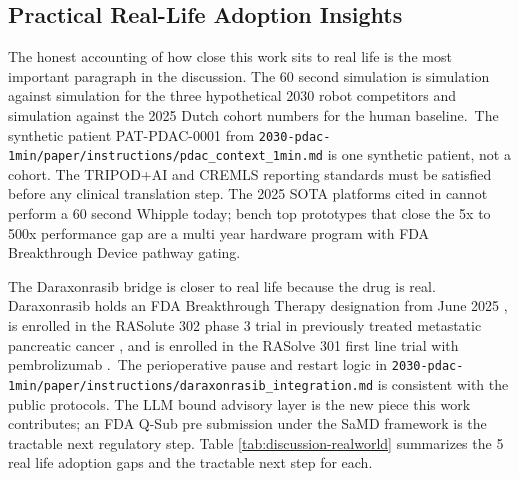\subsection{Practical Real-Life Adoption Insights}
\label{sec:discussion-realworld}

The honest accounting of how close this work sits to real life is
the most important paragraph in the discussion. The 60 second
simulation is simulation against simulation for the three
hypothetical 2030 robot competitors and simulation against the
2025 Dutch cohort numbers \cite{DutchCohort2025Whipple} for the
human baseline.\ The synthetic patient PAT-PDAC-0001 from
\texttt{2030-pdac-1min/paper/instructions/pdac_context_1min.md}
is one synthetic patient, not a cohort. The TRIPOD+AI
\cite{Collins2024TRIPODAI} and CREMLS \cite{ElEmam2024CREMLS}
reporting standards must be satisfied before any clinical
translation step. The 2025 SOTA platforms cited in
\cite{intuitive-davinci-sp, medtronic-hugo-ras}
cannot perform a 60 second Whipple today; bench top prototypes
that close the 5x to 500x performance gap are a multi year
hardware program with FDA Breakthrough Device pathway gating.

The Daraxonrasib bridge is closer to real life because the drug
is real. Daraxonrasib holds an FDA Breakthrough Therapy
designation from June 2025 \cite{rev-fda-breakthrough}, is
enrolled in the RASolute 302 phase 3 trial in previously treated
metastatic pancreatic cancer \cite{rasolute302}, and is enrolled
in the RASolve 301 first line trial with pembrolizumab
\cite{rasolve301}.\ The perioperative pause and restart logic in
\texttt{2030-pdac-1min/paper/instructions/daraxonrasib_integration.md}
is consistent with the public protocols. The LLM bound advisory
layer is the new piece this work contributes; an FDA Q-Sub pre
submission under the SaMD framework \cite{fda-samd} is the
tractable next regulatory step. Table \ref{tab:discussion-realworld}
summarizes the 5 real life adoption gaps and the tractable next
step for each.

